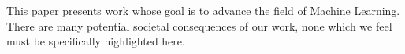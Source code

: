 \documentclass{article}
\theoremstyle{plain}
\theoremstyle{definition}
\theoremstyle{remark}
\begin{document}
This paper presents work whose goal is to advance the field of Machine
Learning. There are many potential societal consequences of our work, none
which we feel must be specifically highlighted here.







\end{document}
